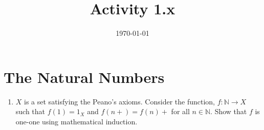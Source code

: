 \documentclass[12pt]{amsart}
\title{Activity 1.x}
\date{\today}
\begin{document}
\maketitle
\part*{The Natural Numbers}
\begin{enumerate}
\item $X$ is a set satisfying the Peano's axioms. Consider the function, $f: \mathbb{N} \to X$ such that $f(1) = 1_X$ and $f(n+) = f(n)+$ for all $n \in \mathbb{N}$. Show that $f$ is one-one using mathematical induction.
\end{enumerate}
\end{document}
